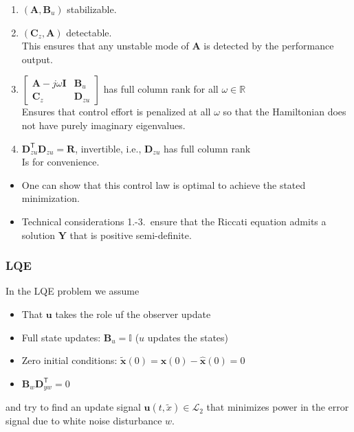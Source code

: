 
\begin{enumerate}
    \item $(\mathbf{A},\mathbf{B}_u)$ stabilizable.
    \item $(\mathbf{C}_z,\mathbf{A})$ detectable.\\
          This ensures that any unstable mode of $\mathbf{A}$ is detected by the performance output.
    \item $\begin{bmatrix} \mathbf{A}- j\omega \mathbf{I}& \mathbf{B}_u\\ \mathbf{C}_z& \mathbf{D}_{zu}\end{bmatrix}$ has full column rank for all $\omega\in\mathbb{R}$\\
          Ensures that control effort is penalized at all $\omega$ so that the Hamiltonian does not have purely imaginary eigenvalues.
    \item $\mathbf{D}_{zu}^{\mathsf{T}}\mathbf{D}_{zu}=\mathbf{R}$, invertible, i.e., $\mathbf{D}_{zu}$ has full column rank\\
          Is for convenience.
\end{enumerate}


\begin{itemize}
    \item One can show that this control law is optimal to achieve the stated minimization.
    \item Technical considerations 1.-3.\ ensure that the Riccati equation admits a solution $\mathbf{Y}$ that is positive semi-definite.
\end{itemize}


\subsubsection{LQE}
In the LQE problem we assume
\begin{itemize}
    \item That $\mathbf{u}$ takes the role uf the observer update
    \item Full state updates: $\mathbf{B}_u=\mathbf{\mathbb{I}}$ ($u$ updates the states)
    \item Zero initial conditions: $\tilde{\mathbf{x}}(0)=\mathbf{x}(0)-\hat{\mathbf{x}}(0)=0$
    \item $\mathbf{B}_w \mathbf{D}_{yw}^{\mathsf{T}}=0$
\end{itemize}
and try to find an update signal $\mathbf{u}(t,\tilde{x})\in \mathcal{L}_2$ that minimizes power in the error signal due to white noise disturbance $w$.

